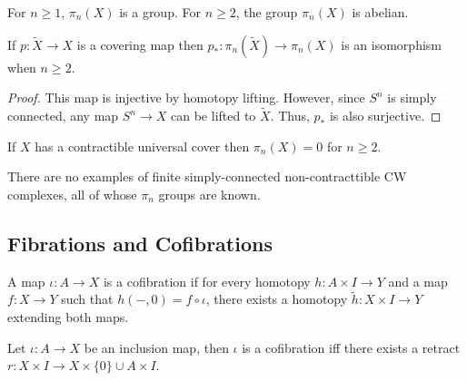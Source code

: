 \documentclass[12pt]{extarticle}
\begin{document}
\begin{corollary}
For $n \ge 1$, $\pi_n(X)$ is a group. For $n \ge 2$, the group $\pi_n(X)$ is abelian. 
\end{corollary}

\begin{proposition}
If $p : \tilde{X} \to X$ is a covering map then $p_* : \pi_n(\tilde{X}) \to \pi_n(X)$ is an isomorphism when $n \ge 2$.
\end{proposition}

\begin{proof}
This map is injective by homotopy lifting. However, since $S^n$ is simply connected, any map $S^n \to X$ can be lifted to $\tilde{X}$. Thus, $p_*$ is also surjective.
\end{proof}

\begin{corollary}
If $X$ has a contractible universal cover then $\pi_n(X) = 0$ for $n \ge 2$. 
\end{corollary}


\begin{remark}
There are no examples of finite simply-connected non-contracttible CW complexes, all of whose $\pi_n$ groups are known.
\end{remark}


\subsection{Fibrations and Cofibrations}

\begin{definition}
A map $ \iota : A \to X$ is a cofibration if for every homotopy $h : A \times I \to Y$ and a map $f : X \to Y$ such that $h(-, 0) = f \circ \iota$, there exists a homotopy $\tilde{h} : X \times I \to Y$ extending both maps.
\begin{center}
\end{center}
\end{definition}

\begin{lemma}
Let $\iota : A \to X$ be an inclusion map, then $\iota$ is a cofibration iff there exists a retract $r : X \times I \to X \times \{0\} \cup A \times I$. 
\end{lemma}
\end{document}
